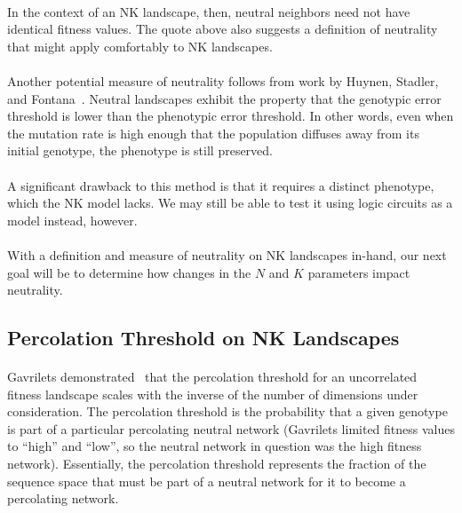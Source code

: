 \documentclass[12pt,letterpaper,titlepage]{article}
\begin{document}
\paragraph{}
In the context of an NK landscape, then, neutral neighbors need not have
identical fitness values. The quote above also suggests a definition of
neutrality that might apply comfortably to NK landscapes.

\paragraph{}
Another potential measure of neutrality follows from work by Huynen, Stadler,
and Fontana~\cite{Huynen1996a}. Neutral landscapes exhibit the property that
the genotypic error threshold is lower than the phenotypic error threshold. In
other words, even when the mutation rate is high enough that the population
diffuses away from its initial genotype, the phenotype is still preserved.

\paragraph{}
A significant drawback to this method is that it requires a distinct phenotype,
which the NK model lacks. We may still be able to test it using logic circuits
as a model instead, however.

\paragraph{}
With a definition and measure of neutrality on NK landscapes in-hand, our next
goal will be to determine how changes in the $N$ and $K$ parameters impact
neutrality.

\subsection{Percolation Threshold on NK Landscapes}

\paragraph{}
Gavrilets demonstrated~\cite{Gavrilets1997} that the percolation threshold for
an uncorrelated fitness landscape scales with the inverse of the number of
dimensions under consideration. The percolation threshold is the probability
that a given genotype is part of a particular percolating neutral network
(Gavrilets limited fitness values to ``high'' and ``low'', so the neutral
network in question was the high fitness network). Essentially, the percolation
threshold represents the fraction of the sequence space that must be part of a
neutral network for it to become a percolating network.
\end{document}
